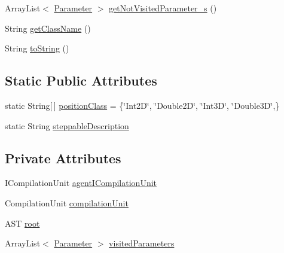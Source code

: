 \begin{DoxyCompactItemize}
\item 
Array\-List$<$ \hyperlink{classit_1_1isislab_1_1masonassisteddocumentation_1_1mason_1_1analizer_1_1_parameter}{Parameter} $>$ \hyperlink{classit_1_1isislab_1_1masonassisteddocumentation_1_1mason_1_1analizer_1_1_agent_analizer_ad237f6e49d6d49e0138b1e2ac6a2b0bb}{get\-Not\-Visited\-Parameter\-\_\-s} ()
\item 
String \hyperlink{classit_1_1isislab_1_1masonassisteddocumentation_1_1mason_1_1analizer_1_1_agent_analizer_a94492199c5e4873a07a2a46d15617937}{get\-Class\-Name} ()
\item 
String \hyperlink{classit_1_1isislab_1_1masonassisteddocumentation_1_1mason_1_1analizer_1_1_agent_analizer_aa1e783609d0c0ffbb244ba4c22abc7b9}{to\-String} ()
\end{DoxyCompactItemize}
\subsection*{Static Public Attributes}
\begin{DoxyCompactItemize}
\item 
static String\mbox{[}$\,$\mbox{]} \hyperlink{classit_1_1isislab_1_1masonassisteddocumentation_1_1mason_1_1analizer_1_1_agent_analizer_aea5eff658e91428950dd0efd1339bf36}{position\-Class} = \{\char`\"{}Int2\-D\char`\"{}, \char`\"{}Double2\-D\char`\"{}, \char`\"{}Int3\-D\char`\"{}, \char`\"{}Double3\-D\char`\"{},\}
\item 
static String \hyperlink{classit_1_1isislab_1_1masonassisteddocumentation_1_1mason_1_1analizer_1_1_agent_analizer_a5c6d63f226ee1dc2a0749c6a5ee40dd9}{steppable\-Description}
\end{DoxyCompactItemize}
\subsection*{Private Attributes}
\begin{DoxyCompactItemize}
\item 
I\-Compilation\-Unit \hyperlink{classit_1_1isislab_1_1masonassisteddocumentation_1_1mason_1_1analizer_1_1_agent_analizer_ab0d7780b5d7b3607251116bf7bcde320}{agent\-I\-Compilation\-Unit}
\item 
Compilation\-Unit \hyperlink{classit_1_1isislab_1_1masonassisteddocumentation_1_1mason_1_1analizer_1_1_agent_analizer_aad9b5d0882694d2802dc24c982f21985}{compilation\-Unit}
\item 
A\-S\-T \hyperlink{classit_1_1isislab_1_1masonassisteddocumentation_1_1mason_1_1analizer_1_1_agent_analizer_a83430d48ecbe1fc48d0cd8f10c2d99a8}{root}
\item 
Array\-List$<$ \hyperlink{classit_1_1isislab_1_1masonassisteddocumentation_1_1mason_1_1analizer_1_1_parameter}{Parameter} $>$ \hyperlink{classit_1_1isislab_1_1masonassisteddocumentation_1_1mason_1_1analizer_1_1_agent_analizer_aee5454eb7063c444081bdb2556d3a60b}{visited\-Parameters}
\end{DoxyCompactItemize}
